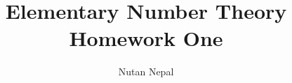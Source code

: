 
\title{Elementary Number Theory\\
        \large Homework One}
\author{Nutan Nepal}

\maketitle
    
    \begin{questions}
        
        
        
        
        
         
    \end{questions}
    
